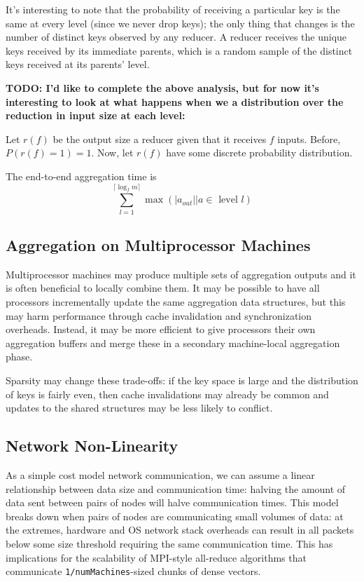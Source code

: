 \documentclass[12pt]{article}
\begin{document}
It's interesting to note that the probability of receiving a particular key is
the same at every level (since we never drop keys); the only thing that changes
is the number of distinct keys observed by any reducer.  A reducer receives
the unique keys received by its immediate parents, which is a random sample of
the distinct keys received at its parents' level.


\textbf{TODO: I'd like to complete the above analysis, but for now it's
interesting to look at what happens when we a distribution over the reduction
in input size at each level:}

Let $r(f)$ be the output size a reducer given that it receives $f$ inputs.
Before, $P(r(f) = 1) = 1$.  Now, let $r(f)$ have some discrete probability
distribution.

The end-to-end aggregation time is
\[
    \sum_{l=1}^{\lceil\log_fm\rceil}
        \max
        \left(
            |a_{out}| | a \in \text{ level } l
        \right)
\]


\pagebreak
\pagebreak

\subsection{Aggregation on Multiprocessor Machines}

Multiprocessor machines may produce multiple sets of aggregation outputs and
it is often beneficial to locally combine them.  It may be possible to have
all processors incrementally update the same aggregation data structures, but
this may harm performance through cache invalidation and synchronization
overheads.  Instead, it may be more efficient to give processors their own
aggregation buffers and merge these in a secondary machine-local aggregation
phase.

Sparsity may change these trade-offs: if the key space is large and the
distribution of keys is fairly even, then cache invalidations may already be
common and updates to the shared structures may be less likely to conflict.

\subsection{Network Non-Linearity}

As a simple cost model network communication, we can assume a linear relationship between data size and communication time: halving the amount of data sent between pairs of nodes will halve communication times.
This model breaks down when pairs of nodes are communicating small volumes of data: at the extremes, hardware and OS network stack overheads can result in all packets below some size threshold requiring the same communication time.
This has implications for the scalability of MPI-style all-reduce algorithms that communicate \texttt{1/numMachines}-sized chunks of dense vectors.
\end{document}
